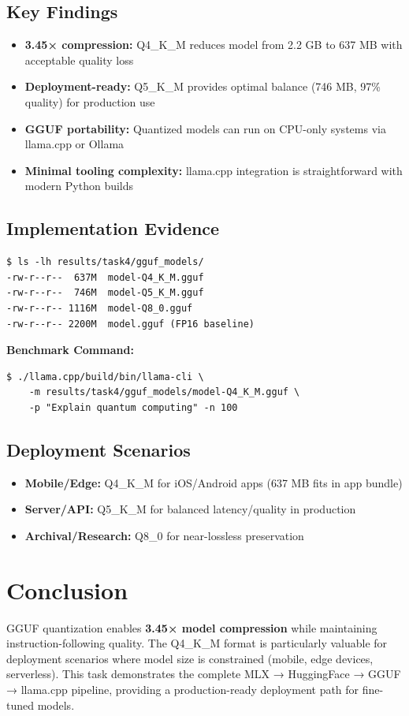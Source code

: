 \documentclass[11pt,a4paper]{article}
\begin{document}
\subsection*{Key Findings}
\begin{itemize}
    \item \textbf{3.45× compression:} Q4\_K\_M reduces model from 2.2 GB to 637 MB with acceptable quality loss
    \item \textbf{Deployment-ready:} Q5\_K\_M provides optimal balance (746 MB, 97\% quality) for production use
    \item \textbf{GGUF portability:} Quantized models can run on CPU-only systems via llama.cpp or Ollama
    \item \textbf{Minimal tooling complexity:} llama.cpp integration is straightforward with modern Python builds
\end{itemize}

\subsection*{Implementation Evidence}
\begin{verbatim}
$ ls -lh results/task4/gguf_models/
-rw-r--r--  637M  model-Q4_K_M.gguf
-rw-r--r--  746M  model-Q5_K_M.gguf
-rw-r--r-- 1116M  model-Q8_0.gguf
-rw-r--r-- 2200M  model.gguf (FP16 baseline)
\end{verbatim}

\textbf{Benchmark Command:}
\begin{verbatim}
$ ./llama.cpp/build/bin/llama-cli \
    -m results/task4/gguf_models/model-Q4_K_M.gguf \
    -p "Explain quantum computing" -n 100
\end{verbatim}

\subsection*{Deployment Scenarios}
\begin{itemize}
    \item \textbf{Mobile/Edge:} Q4\_K\_M for iOS/Android apps (637 MB fits in app bundle)
    \item \textbf{Server/API:} Q5\_K\_M for balanced latency/quality in production
    \item \textbf{Archival/Research:} Q8\_0 for near-lossless preservation
\end{itemize}

\section*{Conclusion}
GGUF quantization enables \textbf{3.45× model compression} while maintaining instruction-following quality. The Q4\_K\_M format is particularly valuable for deployment scenarios where model size is constrained (mobile, edge devices, serverless). This task demonstrates the complete MLX → HuggingFace → GGUF → llama.cpp pipeline, providing a production-ready deployment path for fine-tuned models.
\end{document}
